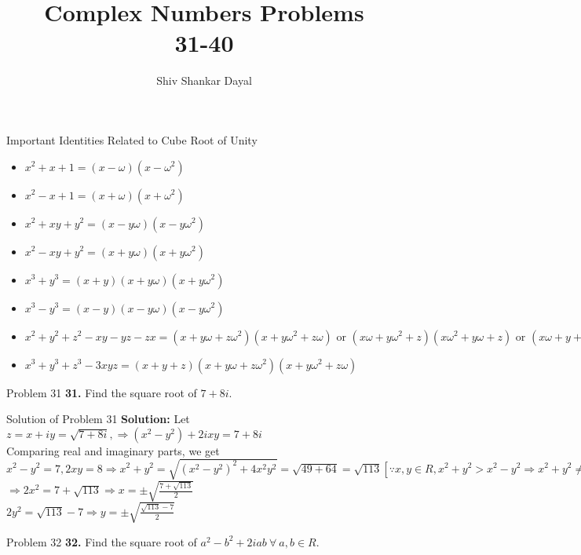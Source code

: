\documentclass[aspectratio=169,8pt]{beamer}
\title{Complex Numbers Problems\\ 31-40}
\author[Shiv Shankar Dayal]{Shiv Shankar Dayal}
\begin{document}
\begin{frame}
  \titlepage
\end{frame}
\begin{frame}{Important Identities Related to Cube Root of Unity}
  \begin{itemize}
  \item $x^2 + x + 1 = (x - \omega)(x - \omega^2)$
  \item $x^2 - x + 1 = (x + \omega)(x + \omega^2)$
  \item $x^2 + xy + y^2 = (x - y\omega)(x - y\omega^2)$
  \item $x^2 - xy + y^2 = (x + y\omega)(x + y\omega^2)$
  \item $x^3 + y^3 = (x + y)(x + y\omega)(x + y\omega^2)$
  \item $x^3 - y^3 = (x - y)(x - y\omega)(x - y\omega^2)$
  \item $x^2 + y^2 + z^2 - xy - yz - zx = (x + y\omega + z\omega^2)(x + y\omega^2 + z\omega) \text{~or~} (x\omega + y\omega^2 + z)(x\omega^2 + y\omega + z)
    \text{~or~}(x\omega + y + z\omega^2)(x\omega^2 + y + z\omega)$
  \item $x^3 + y^3 + z^3 - 3xyz = (x + y + z)(x + y\omega + z\omega^2)(x+ y\omega^2 + z\omega)$
  \end{itemize}
\end{frame}
\begin{frame}{Problem 31}
  \textbf{31.} Find the square root of $7 + 8i.$
\end{frame}
\begin{frame}{Solution of Problem 31}
  \textbf{Solution:} Let $z = x + iy = \sqrt{7 + 8i}, \Rightarrow (x^2 - y^2) + 2ixy = 7 + 8i$\\
  \vspace*{0.2cm}
  Comparing real and imaginary parts, we get\\
  \vspace*{0.2cm}
  $x^2 - y^2 = 7, 2xy = 8 \Rightarrow x^2 + y^2 = \sqrt{(x^2 - y^2)^2 + 4x^2y^2} = \sqrt{49 + 64} = \sqrt{113}[\because x, y \in R, x^2 + y^2 > x^2 - y^2 \Rightarrow x^2+ y^2\neq -\sqrt{113}]$\\
  \vspace*{0.2cm}
  $\Rightarrow 2x^2 = 7 + \sqrt{113}\Rightarrow x = \pm\sqrt{\frac{7 + \sqrt{113}}{2}}$\\
  \vspace*{0.2cm}
  $2y^2 = \sqrt{113} - 7 \Rightarrow y = \pm\sqrt{\frac{\sqrt{113} - 7}{2}}$
\end{frame}
\begin{frame}{Problem 32}
  \textbf{32.} Find the square root of $a^2 - b^2 + 2iab~\forall~a, b\in R.$
\end{frame}
\end{document}
